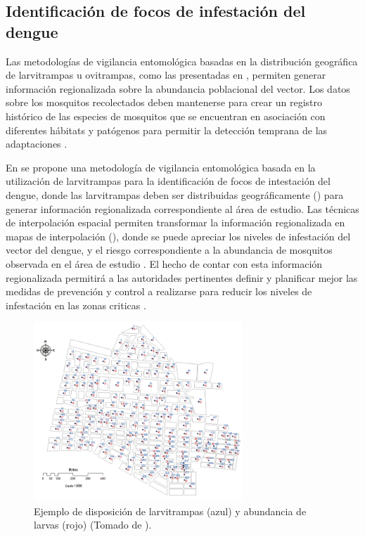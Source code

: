 \subsection{Identificación de focos de infestación del dengue}
\label{sec:cap4-identificacion-focos}
Las metodologías de vigilancia entomológica basadas en la distribución geográfica de larvitrampas
u ovitrampas, como las presentadas en
\cite{NINO2011,petric2012surveillance, journal.pone.0054167,nino2008uso}, permiten generar
información regionalizada sobre la abundancia poblacional del vector. Los datos
sobre los mosquitos recolectados deben mantenerse para crear un registro histórico de las
especies de mosquitos que se encuentran en asociación con diferentes hábitats y patógenos para
permitir la detección temprana de las adaptaciones \cite{petric2012surveillance}.

En \cite{NINO2011} se propone una metodología de vigilancia entomológica basada en la utilización
de larvitrampas para la identificación de focos de intestación del dengue, donde las larvitrampas
deben ser distribuidas geográficamente () para generar
información regionalizada correspondiente al área de estudio. Las técnicas de
interpolación espacial permiten transformar la información regionalizada en mapas de
interpolación (), donde se puede apreciar los niveles
de infestación del vector del dengue, y el riesgo correspondiente a la abundancia de mosquitos
observada en el área de estudio \cite{NINO2011}. El hecho de contar con esta información
regionalizada permitirá a las autoridades pertinentes definir y planificar mejor las medidas de
prevención y control a realizarse para reducir los niveles de infestación en las zonas criticas
\cite{NINO2011, nino2008uso, petric2012surveillance}.

\begin{figure}[!htbp]
\centering
\includegraphics[width=0.7\textwidth]{capitulo-2/graphics/distribucion-puntos-control.png}
\caption{\label{fig:sig-distribucion-puntos-control}Ejemplo de disposición de larvitrampas (azul) y abundancia de larvas (rojo) (Tomado de \cite{NINO2011}).}
\end{figure}

